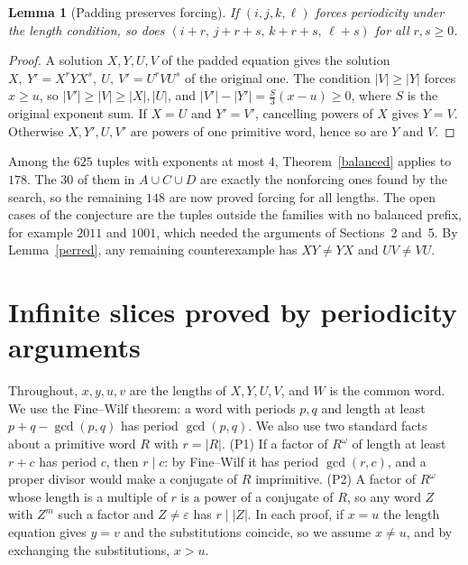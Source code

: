 \documentclass[10pt]{article}
\newtheorem{lemma}[theorem]{Lemma}
\newcommand{\eps}{\varepsilon}
\theoremstyle{remark}\newtheorem*{remark}{Remark}
\begin{document}
\begin{lemma}[Padding preserves forcing]\label{padding}
If \((i,j,k,\ell)\) forces periodicity under the length condition, so does \((i+r,\,j+r+s,\,k+r+s,\,\ell+s)\) for all \(r,s\ge0\).
\end{lemma}
\begin{proof}
A solution \(X,Y,U,V\) of the padded equation gives the solution \(X,\ Y'=X^rYX^s,\ U,\ V'=U^rVU^s\) of the original one. The condition \(|V|\ge|Y|\) forces \(x\ge u\), so \(|V'|\ge|V|\ge|X|,|U|\), and \(|V'|-|Y'|=\tfrac{S}{3}(x-u)\ge0\), where \(S\) is the original exponent sum. If \(X=U\) and \(Y'=V'\), cancelling powers of \(X\) gives \(Y=V\). Otherwise \(X,Y',U,V'\) are powers of one primitive word, hence so are \(Y\) and \(V\).
\end{proof}
Among the \(625\) tuples with exponents at most \(4\), Theorem~\ref{balanced} applies to \(178\). The \(30\) of them in \(A\cup C\cup D\) are exactly the nonforcing ones found by the search, so the remaining \(148\) are now proved forcing for all lengths. The open cases of the conjecture are the tuples outside the families with no balanced prefix, for example \(2011\) and \(1001\), which needed the arguments of Sections~2 and~5. By Lemma~\ref{perred}, any remaining counterexample has \(XY\ne YX\) and \(UV\ne VU\).

\section{Infinite slices proved by periodicity arguments}
Throughout, \(x,y,u,v\) are the lengths of \(X,Y,U,V\), and \(W\) is the common word. We use the Fine--Wilf theorem: a word with periods \(p,q\) and length at least \(p+q-\gcd(p,q)\) has period \(\gcd(p,q)\). We also use two standard facts about a primitive word \(R\) with \(r=|R|\). (P1) If a factor of \(R^\omega\) of length at least \(r+c\) has period \(c\), then \(r\mid c\): by Fine--Wilf it has period \(\gcd(r,c)\), and a proper divisor would make a conjugate of \(R\) imprimitive. (P2) A factor of \(R^\omega\) whose length is a multiple of \(r\) is a power of a conjugate of \(R\), so any word \(Z\) with \(Z^m\) such a factor and \(Z\ne\eps\) has \(r\mid |Z|\). In each proof, if \(x=u\) the length equation gives \(y=v\) and the substitutions coincide, so we assume \(x\ne u\), and by exchanging the substitutions, \(x>u\).
\end{document}
